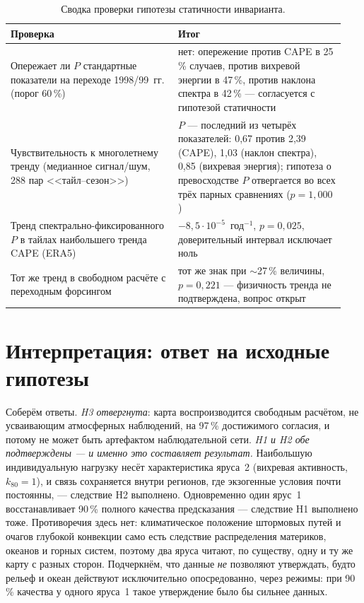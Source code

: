 \documentclass[11pt,a4paper]{article}
\begin{document}
\begin{table}[t]
\centering
\caption{Сводка проверки гипотезы статичности инварианта.}
\label{tab:static}
\small
\begin{tabular}{@{}p{0.47\linewidth}p{0.47\linewidth}@{}}
\toprule
Проверка & Итог\\
\midrule
Опережает ли $P$ стандартные показатели на переходе 1998/99~гг. (порог 60\,\%) & нет: опережение против CAPE в 25\,\% случаев, против вихревой энергии в 47\,\%, против наклона спектра в 42\,\% --- согласуется с гипотезой статичности\\
Чувствительность к многолетнему тренду (медианное сигнал/шум, 288 пар <<тайл--сезон>>) & $P$ --- последний из четырёх показателей: 0,67 против 2,39 (CAPE), 1,03 (наклон спектра), 0,85 (вихревая энергия); гипотеза о превосходстве $P$ отвергается во всех трёх парных сравнениях ($p=1{,}000$)\\
Тренд спектрально-фиксированного $P$ в тайлах наибольшего тренда CAPE (ERA5) & $-8{,}5\cdot10^{-5}$~год$^{-1}$, $p=0{,}025$, доверительный интервал исключает ноль\\
Тот же тренд в свободном расчёте с переходным форсингом & тот же знак при $\sim$27\,\% величины, $p=0{,}221$ --- физичность тренда не подтверждена, вопрос открыт\\
\bottomrule
\end{tabular}
\end{table}

\section{Интерпретация: ответ на исходные гипотезы}
\label{sec:interp}

Соберём ответы. \emph{H3 отвергнута}: карта воспроизводится свободным расчётом, не усваивающим атмосферных наблюдений, на 97\,\% достижимого согласия, и потому не может быть артефактом наблюдательной сети. \emph{H1 и H2 обе подтверждены --- и именно это составляет результат.} Наибольшую индивидуальную нагрузку несёт характеристика яруса~2 (вихревая активность, $k_{80}=1$), и связь сохраняется внутри регионов, где экзогенные условия почти постоянны, --- следствие H2 выполнено. Одновременно один ярус~1 восстанавливает 90\,\% полного качества предсказания --- следствие H1 выполнено тоже. Противоречия здесь нет: климатическое положение штормовых путей и очагов глубокой конвекции само есть следствие распределения материков, океанов и горных систем, поэтому два яруса читают, по существу, одну и ту же карту с разных сторон. Подчеркнём, что данные \emph{не} позволяют утверждать, будто рельеф и океан действуют исключительно опосредованно, через режимы: при 90\,\% качества у одного яруса~1 такое утверждение было бы сильнее данных.
\end{document}
